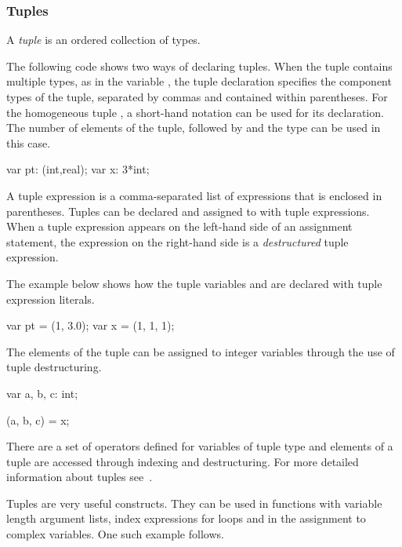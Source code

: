 \subsubsection{Tuples}

A \emph{tuple} is an ordered collection of types.
\begin{example}
The following code shows two ways of declaring tuples.  When the tuple
contains multiple types, as in the variable , the tuple
declaration specifies the component types of the tuple, separated by
commas and contained within parentheses.  For the homogeneous
tuple , a short-hand notation can be used for its declaration.
The number of elements of the tuple, followed by \chpl{*} and the type
can be used in this case.

\begin{chapel}
var pt: (int,real);
var x: 3*int;
\end{chapel}
\end{example}

A tuple expression is a comma-separated list of expressions that is
enclosed in parentheses.  Tuples can be declared and assigned to with
tuple expressions.  When a tuple expression appears on the left-hand
side of an assignment statement, the expression on the right-hand side
is a \emph{destructured} tuple expression.

\begin{example}

The example below shows how the tuple variables  and 
are declared with tuple expression literals.
\begin{chapel}
var pt = (1, 3.0);
var x = (1, 1, 1);
\end{chapel}

The elements of the tuple  can be assigned to integer variables
through the use of tuple destructuring.
\begin{chapel}
var a, b, c: int;

(a, b, c) = x;
\end{chapel}
\end{example}

There are a set of operators defined for variables of tuple type
and elements of a tuple are accessed through indexing and destructuring.  
For more detailed information about tuples see~.

Tuples are very useful constructs.  They can be used in functions with
variable length argument lists, index expressions for  loops
and in the assignment to complex variables.  One such example follows.

